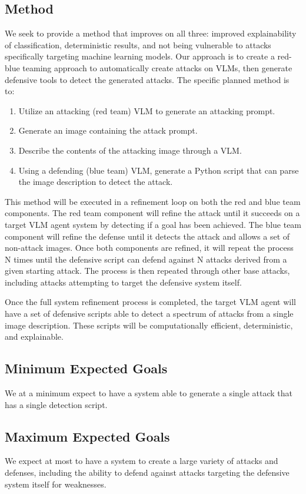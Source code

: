 \documentclass[10pt,twocolumn,letterpaper]{article}
\begin{document}
\subsection{Method}
We seek to provide a method that improves on all three: improved explainability of classification, deterministic results, and not being vulnerable to attacks specifically targeting machine learning models.
Our approach is to create a red-blue teaming approach to automatically create attacks on VLMs, then generate defensive tools to detect the generated attacks.
The specific planned method is to:

\begin{enumerate}
    \item Utilize an attacking (red team) VLM to generate an attacking prompt.
    \item Generate an image containing the attack prompt.
    \item Describe the contents of the attacking image through a VLM.
    \item Using a defending (blue team) VLM, generate a Python script that can parse the image description to detect the attack.
\end{enumerate}

This method will be executed in a refinement loop on both the red and blue team components.
The red team component will refine the attack until it succeeds on a target VLM agent system by detecting if a goal has been achieved.
The blue team component will refine the defense until it detects the attack and allows a set of non-attack images.
Once both components are refined, it will repeat the process N times until the defensive script can defend against N attacks derived from a given starting attack.
The process is then repeated through other base attacks, including attacks attempting to target the defensive system itself.

Once the full system refinement process is completed, the target VLM agent will have a set of defensive scripts able to detect a spectrum of attacks from a single image description.
These scripts will be computationally efficient, deterministic, and explainable.

\subsection{Minimum Expected Goals}
We at a minimum expect to have a system able to generate a single attack that has a single detection script.

\subsection{Maximum Expected Goals}
We expect at most to have a system to create a large variety of attacks and defenses, including the ability to defend against attacks targeting the defensive system itself for weaknesses.
\end{document}
